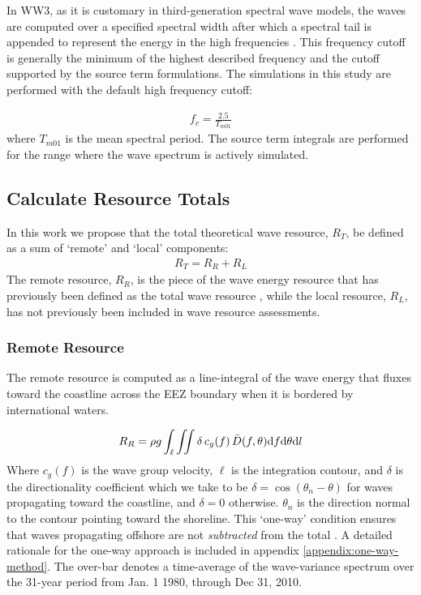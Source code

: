 In WW3, as it is customary in third-generation spectral wave models, the waves are computed over a specified spectral width after which a spectral tail is appended to represent the energy in the high frequencies \citep[e.g.][]{ardhuinObservationSwellDissipation2009}. This frequency cutoff is generally the minimum of the highest described frequency and the cutoff supported by the source term formulations. The simulations in this study are performed with the default high frequency cutoff:

\begin{align}
  f_{c} = \frac{2.5}{T_{m01}}
\end{align}
where $T_{m01}$ is the mean spectral period. The source term integrals are performed for the range where the wave spectrum is actively simulated.

\subsection{Calculate Resource Totals} \label{sec:method:calc}

In this work we propose that the total theoretical wave resource, $R_T$, be defined as a sum of `remote' and `local' components:
\begin{align}
  R_T = R_R + R_L
\end{align}
The remote resource, $R_R$, is the piece of the wave energy resource that has previously been defined as the total wave resource \citep{gunnQuantifyingGlobalWave2012,EPRIwaveresource2011}, while the local resource, $R_L$, has not previously been included in wave resource assessments.

\subsubsection{Remote Resource} \label{sec:method:calc:remote}

The remote resource is computed as a line-integral of the wave energy that fluxes toward the coastline across the EEZ boundary when it is bordered by international waters. 

\begin{align}
  R_R = \rho g \int_{\ell}\iint \delta \, c_g(f) \, \bar{D}(f,\theta) \mathrm{d} f \mathrm{d} \theta \mathrm{d} l
\label{eqn:RR}
\end{align}
Where $c_g(f)$ is the wave group velocity, $\ell$ is the integration contour, and $\delta$ is the directionality coefficient which we take to be $\delta = \cos(\theta_n - \theta)$ for waves propagating toward the coastline, and $\delta = 0$ otherwise. 
$\theta_n$ is the direction normal to the contour pointing toward the shoreline. 
This `one-way' condition ensures that waves propagating offshore are not {\em subtracted} from the total \citep[]{gunnQuantifyingGlobalWave2012}. A detailed rationale for the one-way approach is included in appendix \ref{appendix:one-way-method}. The over-bar denotes a time-average of the wave-variance spectrum over the 31-year period from Jan. 1 1980, through Dec 31, 2010.

